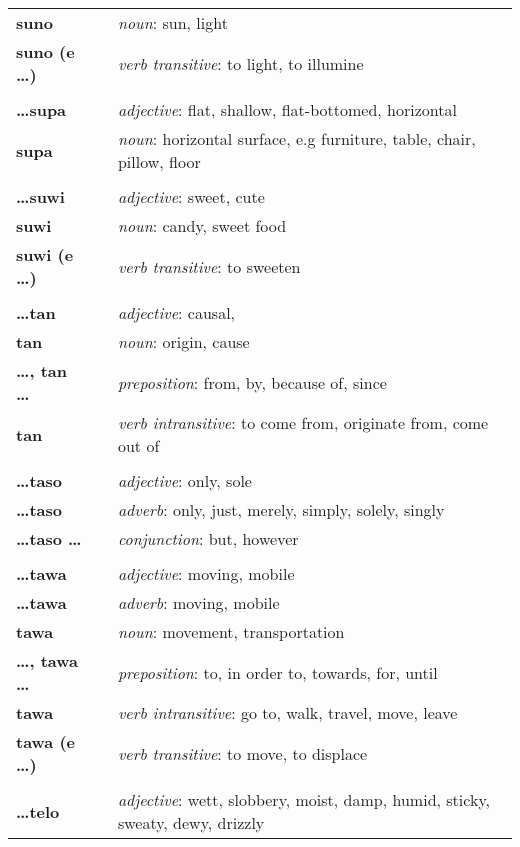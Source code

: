 \begin{supertabular}{p{2,5cm}|ll}
\textbf{suno} && \textit{noun}: sun, light \\ 
\textbf{suno (e \dots)} && \textit{verb transitive}: to light, to illumine \\ 
 && \\ %
 \textbf{\dots supa} && \textit{adjective}: flat, shallow, flat-bottomed, horizontal \\ 
\textbf{supa} && \textit{noun}: horizontal surface, e.g furniture, table, chair, pillow, floor \\ 
 && \\ %
\textbf{\dots suwi} && \textit{adjective}: sweet, cute \\ 
\textbf{suwi} && \textit{noun}: candy, sweet food \\ 
\textbf{suwi (e \dots)} && \textit{verb transitive}: to sweeten \\ 
 && \\ %
\textbf{\dots tan} && \textit{adjective}: causal, \\ 
\textbf{tan} && \textit{noun}: origin, cause \\ 
\textbf{\dots , tan \dots} && \textit{preposition}: from, by, because of, since \\ 
\textbf{tan} && \textit{verb intransitive}: to come from, originate from, come out of \\ 
 && \\ %
\textbf{\dots taso} && \textit{adjective}: only, sole \\ 
\textbf{\dots taso} && \textit{adverb}: only, just, merely, simply, solely, singly \\ 
\textbf{\dots taso \dots} && \textit{conjunction}: but, however \\ 
 && \\ %
\textbf{\dots tawa} && \textit{adjective}: moving, mobile \\ 
\textbf{\dots tawa} && \textit{adverb}: moving, mobile \\ 
\textbf{tawa} && \textit{noun}: movement, transportation \\ 
\textbf{\dots , tawa \dots} && \textit{preposition}: to, in order to, towards, for, until \\ 
\textbf{tawa} && \textit{verb intransitive}: go to, walk, travel, move, leave \\ 
\textbf{tawa (e \dots)} && \textit{verb transitive}: to move, to displace \\ 
 && \\ %
\textbf{\dots telo} && \textit{adjective}: wett, slobbery, moist, damp, humid, sticky, sweaty, dewy, drizzly \\ 

\end{supertabular}
